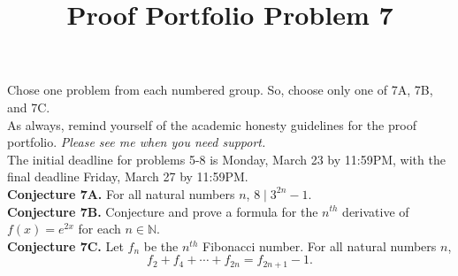 \documentclass{article}  %
\title{Proof Portfolio Problem 7 }
\author{}
\date{}
\newcommand{\N}{\mathbb{N}}
\begin{document}
\maketitle

Chose one problem from each numbered group. So, choose only one of 7A, 7B, and 7C.\\

As always, remind yourself of the academic honesty guidelines for the proof portfolio. \emph{Please see me when you need support.}\\

The initial deadline for problems 5-8 is Monday, March 23 by 11:59PM, with the final deadline Friday, March 27 by 11:59PM.\\





\noindent\textbf{Conjecture 7A.}  For all natural numbers $n$, $8\mid 3^{2n}-1$.\\

\noindent\textbf{Conjecture 7B.}  Conjecture and prove a formula for the $n^{th}$ derivative of $f(x) =  e^{2x}$ for each $n\in\N$.\\

\noindent\textbf{Conjecture 7C.} Let $f_n$ be the $n^{th}$ Fibonacci number. For all natural numbers $n$, 
\[f_2+f_4+\cdots+f_{2n} = f_{2n+1}-1.\]
\end{document}
